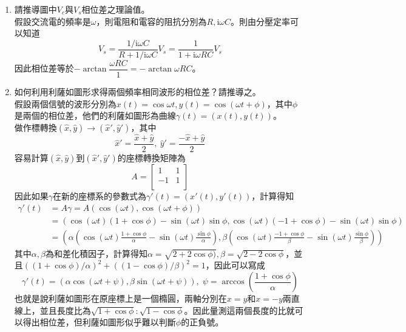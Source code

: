 \documentclass[12pt, a4paper]{article}
\def\large{\fontsize{14}{21}\selectfont}
\newcommand{\img}{\mathrm{i}}
\begin{document}
\begin{enumerate}[itemsep=20pt, topsep=10pt]
	\item {\large 請推導圖中$V_c$與$V_s$相位差之理論值。} \\[10pt]
		假設交流電的頻率是$\omega$，則電阻和電容的阻抗分別為$R, \img \omega C$。則由分壓定率可以知道
		\[ V_s = \frac{1/\img \omega C}{R + 1/\img \omega C} V_s = \frac{1}{1 + \img \omega R C} V_s \]
		因此相位差等於$- \arctan \dfrac{ \omega R C}{1} = - \arctan \omega R C$。

	\item {\large 如何利用利薩如圖形求得兩個頻率相同波形的相位差？請推導之。} \\[10pt]
		假設兩個信號的波形分別為$ x(t) = \cos \omega t , y(t) = \cos \left( \omega t + \phi \right) $，其中$\phi$是兩個的相位差，他們的利薩如圖形為曲線$\gamma(t) = (x(t), y(t))$。\\
		做作標轉換$(\hat{x}, \hat{y}) \rightarrow (\hat{x}', \hat{y}')$，其中
		\[ \hat{x}' = \frac{\hat{x} + \hat{y}}{2}, \: \hat{y}' = \frac{ - \hat{x} + \hat{y} }{2} \]
		容易計算$(\hat{x}, \hat{y})$到$(\hat{x}', \hat{y}')$的座標轉換矩陣為
		\[
			A = \begin{bmatrix}
				1 & 1 \\
				-1 & 1\\
			\end{bmatrix}
		\]
		因此如果$\gamma$在新的座標系的參數式為$\gamma'(t) = (x'(t), y'(t))$，計算得知
		\begin{align*}
			\gamma'(t) &= A \gamma = A (\cos (\omega t), \cos (\omega t + \phi)) \\
			&= \left(\cos (\omega t) (1 + \cos \phi) - \sin (\omega t) \sin \phi, \cos(\omega t) (-1 + \cos \phi) - \sin (\omega t) \sin \phi \right)\\
			&= \left(\alpha \left( \cos (\omega t) \frac{1 + \cos \phi}{\alpha} - \sin (\omega t) \frac{\sin \phi}{\alpha}\right), \beta \left( \cos (\omega t) \frac{-1 + \cos \phi}{\beta} - \sin (\omega t) \frac{\sin \phi}{\beta}\right) \right)
		\end{align*}
		其中$\alpha, \beta$為和差化積因子，計算得知$\alpha = \sqrt{2 + 2\cos \phi)}, \beta = \sqrt{2 - 2\cos \phi}$，並且$\left((1 + \cos \phi) / \alpha \right) ^2 + \left((1 - \cos \phi) / \beta \right) ^2 = 1$，因此可以寫成
		\[
			\gamma'(t) = (\alpha \cos(\omega t + \psi), \beta \sin(\omega t + \psi)), \; \psi = \arccos \left( \frac{1 + \cos \phi }{ \alpha } \right) 
		\]
		也就是說利薩如圖形在原座標上是一個橢圓，兩軸分別在$x = y$和$x = -y$兩直線上，並且長度比為$\sqrt{1 + \cos \phi} : \sqrt{1 - \cos \phi}$。因此量測這兩個長度的比就可以得出相位差，但利薩如圖形似乎難以判斷$\phi$的正負號。


\end{enumerate}
\end{document}
